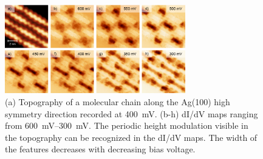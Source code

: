 \begin{figure} \centering
	\includegraphics[width=0.7\textwidth]{./images/paper/helicene/fig-S3}
	\caption{(a) Topography of a molecular chain along the Ag(100) high symmetry direction recorded at \SI{400}{\milli \volt}. (b-h) dI/dV  maps ranging from \SIrange{600}{300}{\milli \volt}. The periodic height modulation visible in the topography can be recognized in the dI/dV maps. The width of the features decreases with decreasing bias voltage.}
	\label{fig:hel-fig-S3}
\end{figure}